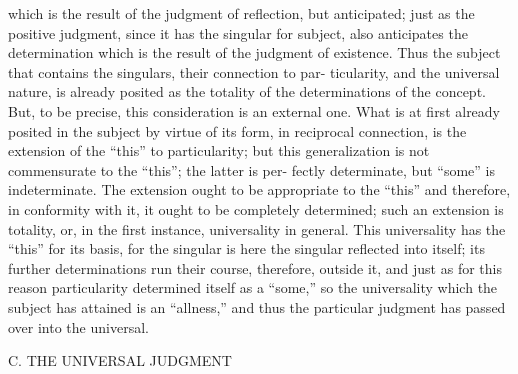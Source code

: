 which is the result of the judgment of reflection, but anticipated; just as
the positive judgment, since it has the singular for subject, also anticipates
the determination which is the result of the judgment of existence.
Thus the subject that contains the singulars, their connection to par-
ticularity, and the universal nature, is already posited as the totality of the
determinations of the concept. But, to be precise, this consideration is an
external one. What is at first already posited in the subject by virtue of its
form, in reciprocal connection, is the extension of the “this” to particularity;
but this generalization is not commensurate to the “this”; the latter is per-
fectly determinate, but “some” is indeterminate. The extension ought to
be appropriate to the “this” and therefore, in conformity with it, it ought
to be completely determined; such an extension is totality, or, in the first
instance, universality in general.
This universality has the “this” for its basis, for the singular is here the
singular reflected into itself; its further determinations run their course,
therefore, outside it, and just as for this reason particularity determined itself
as a “some,” so the universality which the subject has attained is an “allness,”
and thus the particular judgment has passed over into the universal.

C. THE UNIVERSAL JUDGMENT

